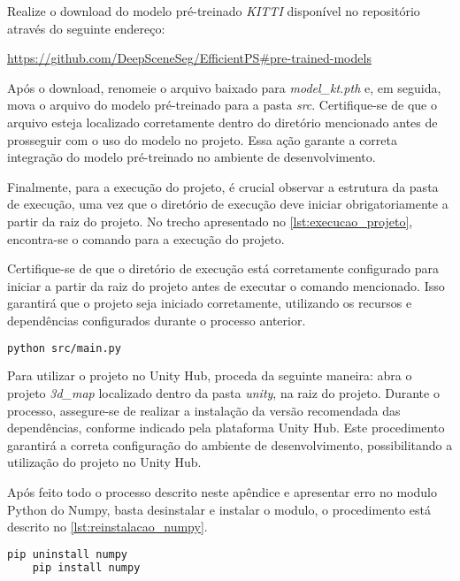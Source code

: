 Realize o download do modelo pré-treinado \emph{KITTI} disponível no repositório através do seguinte endereço:

\url{https://github.com/DeepSceneSeg/EfficientPS#pre-trained-models}

Após o download, renomeie o arquivo baixado para \emph{model\_kt.pth} e, em seguida, mova o arquivo do modelo pré-treinado para a pasta \emph{src}. Certifique-se de que o arquivo esteja localizado corretamente dentro do diretório mencionado antes de prosseguir com o uso do modelo no projeto. Essa ação garante a correta integração do modelo pré-treinado no ambiente de desenvolvimento.

Finalmente, para a execução do projeto, é crucial observar a estrutura da pasta de execução, uma vez que o diretório de execução deve iniciar obrigatoriamente a partir da raiz do projeto. No trecho apresentado no \cref{lst:execucao_projeto}, encontra-se o comando para a execução do projeto.

Certifique-se de que o diretório de execução está corretamente configurado para iniciar a partir da raiz do projeto antes de executar o comando mencionado. Isso garantirá que o projeto seja iniciado corretamente, utilizando os recursos e dependências configurados durante o processo anterior.

\begin{lstlisting}[caption={Trecho de código com comando para execução do projeto},label={lst:execucao_projeto},language=Bash,showstringspaces=false]
    python src/main.py
\end{lstlisting}

Para utilizar o projeto no Unity Hub, proceda da seguinte maneira: abra o projeto \emph{3d\_map} localizado dentro da pasta \emph{unity}, na raiz do projeto. Durante o processo, assegure-se de realizar a instalação da versão recomendada das dependências, conforme indicado pela plataforma Unity Hub. Este procedimento garantirá a correta configuração do ambiente de desenvolvimento, possibilitando a utilização do projeto no Unity Hub.

Após feito todo o processo descrito neste apêndice e apresentar erro no modulo Python do Numpy, basta desinstalar e instalar o modulo, o procedimento está descrito no \cref{lst:reinstalacao_numpy}.

\begin{lstlisting}[caption={Trecho de código com comando para reinstalação do Numpy},label={lst:reinstalacao_numpy},language=Bash,showstringspaces=false]
    pip uninstall numpy
    pip install numpy
\end{lstlisting}
